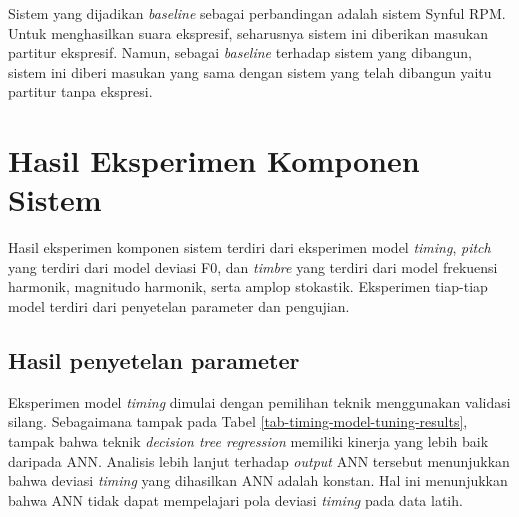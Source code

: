 Sistem yang dijadikan \textit{baseline} sebagai perbandingan adalah sistem Synful RPM. Untuk menghasilkan suara ekspresif, seharusnya sistem ini diberikan masukan partitur ekspresif. Namun, sebagai \textit{baseline} terhadap sistem yang dibangun, sistem ini diberi masukan yang sama dengan sistem yang telah dibangun yaitu partitur tanpa ekspresi.

\section{Hasil Eksperimen Komponen Sistem}

Hasil eksperimen komponen sistem terdiri dari eksperimen model \textit{timing}, \textit{pitch} yang terdiri dari model deviasi F0, dan \textit{timbre} yang terdiri dari model frekuensi harmonik, magnitudo harmonik, serta amplop stokastik. Eksperimen tiap-tiap model terdiri dari penyetelan parameter dan pengujian.

\subsection{Hasil penyetelan parameter}

Eksperimen model \textit{timing} dimulai dengan pemilihan teknik menggunakan validasi silang. Sebagaimana tampak pada Tabel \ref{tab-timing-model-tuning-results}, tampak bahwa teknik \textit{decision tree regression} memiliki kinerja yang lebih baik daripada ANN. Analisis lebih lanjut terhadap \textit{output} ANN tersebut menunjukkan bahwa deviasi \textit{timing} yang dihasilkan ANN adalah konstan. Hal ini menunjukkan bahwa ANN tidak dapat mempelajari pola deviasi \textit{timing} pada data latih.

